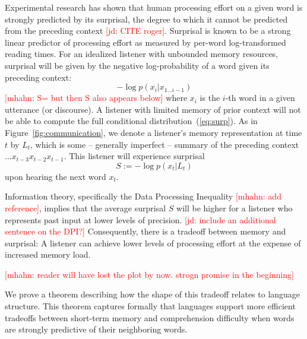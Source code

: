\documentclass[12pt]{article}
\newcounter{theorem}
\newcommand{\jd}[1]{\textcolor{Red}{[jd: #1]}}
\newcommand{\mhahn}[1]{\textcolor{Red}{[mhahn: #1]}}
\begin{document}
Experimental research has shown that human processing effort on a given word is strongly predicted by its surprisal, the degree to which it cannot be predicted from the preceding context \jd{CITE roger}.
Surprisal is known to be a strong linear predictor of processing effort as measured by per-word log-transformed reading times.
For an idealized listener with unbounded memory resources, surprisal will be given by the negative log-probability of a word given its preceding context:
\begin{equation}\label{eq:surp}
	-\log p(x_i|x_{1...i-1})
\end{equation}
\mhahn{S= but then S also appears below}
where $x_i$ is the $i$-th word in a given utterance (or discourse).
%
A listener with limited memory of prior context will not be able to compute the full conditional distribution~(\ref{eq:surp}).
As in Figure~\ref{fig:communication}, we denote a listener's memory representation at time $t$ by $L_t$, which is some -- generally imperfect -- summary of the preceding context $\dots x_{t-3}x_{t-2}x_{t-1}$.
This listener will experience surprisal
\begin{equation}\label{eq:surp-listener}
	S :=	-\log p(x_t|L_t)
\end{equation}
upon hearing the next word $x_t$.


Information theory, specifically the Data Processing Inequality \mhahn{add reference}, implies that the average surprisal $S$ will be higher for a listener who represents past input at lower levels of precision. \jd{include an additional sentence on the DPI?}
Consequently, there is a tradeoff between memory and surprisal:
A listener can achieve lower levels of processing effort at the expense of increased memory load.

\mhahn{reader will have lost the plot by now. strogn promise in the beginning}




We prove a theorem describing how the shape of this tradeoff relates to language structure. %
This theorem captures formally that languages support more efficient tradeoffs between short-term memory and comprehension difficulty when words are strongly predictive of their neighboring words.
\end{document}
